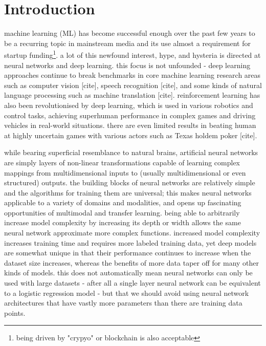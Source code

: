 \chapter{Introduction}


machine learning (ML) has become successful enough  over the past few years to be a recurring topic in mainstream media and its use almost a requirement for startup funding\footnote{being driven by "crypyo" or blockchain is also acceptable}.
a lot of this newfound interest, hype, and hysteria is directed at  neural networks and deep learning. this focus is not unfounded - deep learning approaches continue to break benchmarks in  core machine learning research areas such as computer vision [cite], speech recognition [cite], and  some kinds of natural language processing  such as machine translation [cite].
reinforcement learning has also been revolutionised by deep learning, which is used in various robotics and control tasks, achieving superhuman performance in complex games and driving vehicles in real-world situations.
there are even limited results in  beating human at highly uncertain games with various actors such as Texas holdem poker [cite].

while bearing superficial resemblance to  natural brains, artificial neural networks are simply layers of non-linear transformations  capable of learning complex mappings from multidimensional inputs to (usually multidimensional or even structured) outputs.
the building blocks of neural networks are relatively simple and the algorithms for training them are universal; this makes neural networks applicable to a variety of domains and modalities, and opens up fascinating opportunities of multimodal and transfer learning.
being able to arbitrarily increase model complexity by increasing its depth or width allows the same neural network approximate more complex functions.
increased model complexity increases training time and requires more labeled training data, yet deep models are somewhat unique in that their performance continues to increase when the dataset size increases, whereas the benefits of more data taper off for many other kinds of models.
this does not automatically mean neural networks can only be used with large datasets - after all a single layer neural network can be equivalent to a logistic regression model - but that we should avoid using neural network architectures that have vastly more parameters than there are training data points.

